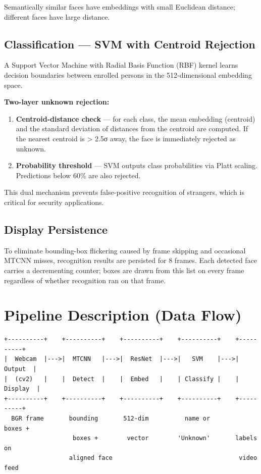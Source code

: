 \documentclass[12pt,a4paper]{article}
\begin{document}
Semantically similar faces have embeddings with small Euclidean distance; different faces have large distance.

\subsection{Classification --- SVM with Centroid Rejection}

A Support Vector Machine with Radial Basis Function (RBF) kernel learns decision boundaries between enrolled persons in the 512-dimensional embedding space.

\textbf{Two-layer unknown rejection:}
\begin{enumerate}
    \item \textbf{Centroid-distance check} --- for each class, the mean embedding (centroid) and the standard deviation of distances from the centroid are computed. If the nearest centroid is > 2.5σ away, the face is immediately rejected as unknown.
    \item \textbf{Probability threshold} --- SVM outputs class probabilities via Platt scaling. Predictions below 60\% are also rejected.
\end{enumerate}

This dual mechanism prevents false-positive recognition of strangers, which is critical for security applications.

\subsection{Display Persistence}

To eliminate bounding-box flickering caused by frame skipping and occasional MTCNN misses, recognition results are persisted for 8 frames. Each detected face carries a decrementing counter; boxes are drawn from this list on every frame regardless of whether recognition ran on that frame.

\section{Pipeline Description (Data Flow)}

\begin{verbatim}
+----------+    +----------+    +----------+    +----------+    +----------+
|  Webcam  |--->|  MTCNN   |--->|  ResNet  |--->|   SVM    |--->|  Output  |
|  (cv2)   |    |  Detect  |    |  Embed   |    | Classify |    | Display  |
+----------+    +----------+    +----------+    +----------+    +----------+
  BGR frame       bounding       512-dim          name or         boxes +
                   boxes +        vector        'Unknown'       labels on
                  aligned face                                   video feed
\end{verbatim}
\end{document}
